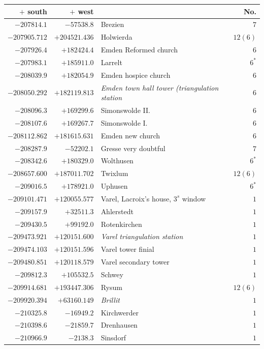 \begin{center}\begingroup\fontsize{8}{9}\selectfont
\setlength{\tabcolsep}{4pt}
\begin{tabular}{r|r|p{170pt}|r}\hline
\(+\) south&\(+\) west&&No.\\\hline
\(-207814.1\)&\(-57538.8\)&Brezien&\(7\)\\
\(-207905.712\)&\(+204521.436\)&Holwierda&\(12 (6)\)\\
\(-207926.4\)&\(+182424.4\)&Emden Reformed church&\(6\)\\
\(-207983.1\)&\(+185911.0\)&Larrelt&\(6^{*}\)\\
\(-208039.9\)&\(+182054.9\)&Emden hospice church&\(6\)\\
\(-208050.292\)&\(+182119.813\)&\textit{Emden town hall tower (triangulation station}&\(6\)\\
\(-208096.3\)&\(+169299.6\)&Simonswolde II.&\(6\)\\
\(-208107.6\)&\(+169267.7\)&Simonswolde I.&\(6\)\\
\(-208112.862\)&\(+181615.631\)&Emden new church&\(6\)\\
\(-208287.9\)&\(-52202.1\)&Gresse very doubtful&\(7\)\\
\(-208342.6\)&\(+180329.0\)&Wolthusen&\(6^{*}\)\\
\(-208657.600\)&\(+187011.702\)&Twixlum&\(12 (6)\)\\
\(-209016.5\)&\(+178921.0\)&Uphusen&\(6^{*}\)\\
\(-209101.471\)&\(+120055.577\)&Varel, Lacroix’s house, \(3^{s}\) window&\(1\)\\
\(-209157.9\)&\(+32511.3\)&Ahlerstedt&\(1\)\\
\(-209430.5\)&\(+99192.0\)&Rotenkirchen&\(1\)\\
\(-209473.921\)&\(+120151.600\)&\textit{Varel triangulation station}&\(1\)\\
\(-209474.103\)&\(+120151.596\)&Varel tower finial&\(1\)\\
\(-209480.851\)&\(+120118.579\)&Varel secondary tower&\(1\)\\
\(-209812.3\)&\(+105532.5\)&Schwey&\(1\)\\
\(-209914.681\)&\(+193447.306\)&Rysum&\(12 (6)\)\\
\(-209920.394\)&\(+63160.149\)&\textit{Brillit}&\(1\)\\
\(-210325.8\)&\(-16949.2\)&Kirchwerder&\(1\)\\
\(-210398.6\)&\(-21859.7\)&Drenhausen&\(1\)\\
\(-210966.9\)&\(-2138.3\)&Sinsdorf&\(1\)\\

\end{tabular}
\end{center}
